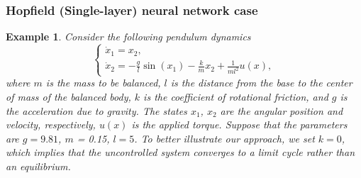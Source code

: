 \documentclass[journal,twoside,web]{ieeecolor}
\newtheorem{example}		[theorem]{Example}
\begin{document}
\subsubsection{‌Hopfield (Single-layer) neural network case} 
\begin{example}\label{example2}
Consider the following pendulum dynamics
\begin{equation}\label{E2}
\left\{\begin{matrix}
\dot{x}_1=x_2,\\
\dot{x}_2=-\frac{g}{l}\sin(x_1)-\frac{k}{m} x_2+\frac{1}{ml^2}u(x),
\end{matrix}\right.
\end{equation} 
where $m$ is the mass to be balanced, $l$ is the distance from the base to the center of mass of the balanced body, $k$ is the coefficient of rotational friction, and $g$ is the acceleration due to gravity. The states $x_1$, $x_2$ are the angular position and velocity, respectively, $u(x)$ is the applied torque. Suppose that the parameters are $g=9.81$, $m$ = 0.15, $l=5$. To better illustrate our approach, we set $k=0$, which implies that the uncontrolled system converges to a limit cycle rather than an equilibrium. 


\end{example}
\end{document}
